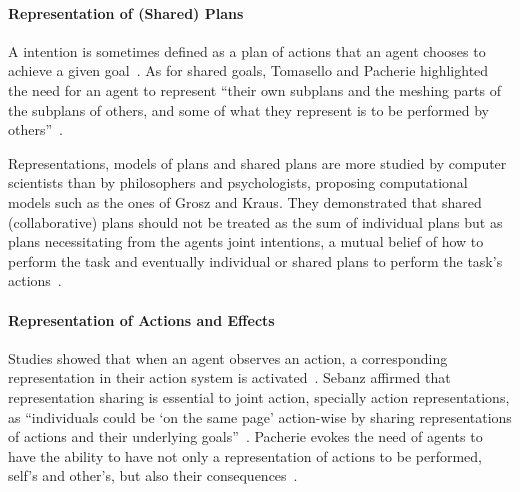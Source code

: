 \documentclass[a4paper,11pt,twoside]{StyleThese}
\begin{document}
\paragraph{Representation of (Shared) Plans}
A intention is sometimes defined as a plan of actions that an agent chooses to achieve a given goal~\cite{tomasello_2005_understanding, kaplan_2006_challenges}. 
As for shared goals, Tomasello \etal{} and Pacherie highlighted the need for an agent to represent ``their own subplans and the meshing parts of the subplans of others, and some of what they represent is to be performed by others''~\cite[p.~353]{pacherie_2012_agency}.

Representations, models of plans and shared plans are more studied by computer scientists than by philosophers and psychologists, proposing computational models such as the ones of Grosz and Kraus. They demonstrated that shared (collaborative) plans should not be treated as the sum of individual plans but as plans necessitating from the agents joint intentions, a mutual belief of how to perform the task and eventually individual or shared plans to perform the task's actions~\cite{grosz_1996_collaborative}.

\paragraph{Representation of Actions and Effects}
Studies showed that when an agent observes an action, a corresponding representation in their action system is activated~\cite{rizzolatti_2004_mirror}. Sebanz \etal{} affirmed that representation sharing is essential to joint action, specially action representations, as ``individuals could be ‘on the same page’ action-wise by sharing representations of actions and their underlying goals''~\cite[p.~71]{sebanz_2006_joint}. Pacherie evokes the need of agents to have the ability to have not only a representation of actions to be performed, self's and other's, but also their consequences~\cite{pacherie_2012_agency}. 
\end{document}

